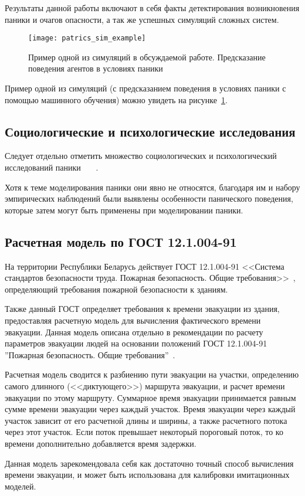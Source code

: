 Результаты данной работы включают в себя факты детектирования возникновения паники и очагов опасности, а так же успешных симуляций сложных систем.

\begin{figure}[ht!]
  \texttt{[image: patrics\_sim\_example]}
  \caption{Пример одной из симуляций в обсуждаемой работе. Предсказание поведения агентов в условиях паники}
  \label{sub:overview:patrics:sim_example}
\end{figure}

Пример одной из симуляций (с предсказанием поведения в условиях паники с помощью машинного обучения) можно увидеть на рисунке~\ref{sub:overview:patrics:sim_example}.


\subsection{Социологические и психологические исследования}
\label{sub:overview:soc}

Следует отдельно отметить множество социологических и психологический исследований паники \cite{mawson2005understanding}~\cite{quarantelli1975panic}~\cite{quarantelli2001sociology}~\cite{quarantelli1979panic}.

Хотя к теме моделирования паники они явно не относятся, благодаря им и набору эмпирических наблюдений были выявлены особенности панического поведения,
которые затем могут быть применены при моделировании паники.


\subsection{Расчетная модель по ГОСТ 12.1.004-91}
\label{sub:overview:gost}

На территории Республики Беларусь действует ГОСТ 12.1.004-91 <<Система стандартов безопасности труда. Пожарная безопасность. Общие требования>>~\cite{gost_fire_safety},
определяющий требования пожарной безопасности к зданиям.

Также данный ГОСТ определяет требования к времени эвакуации из здания, предоставляя расчетную модель для вычисления фактического времени эвакуации.
Данная модель описана отдельно в рекомендации по расчету параметров эвакуации людей на основании положений ГОСТ 12.1.004-91 ''Пожарная безопасность. Общие требования''~\cite{model_gost}.

Расчетная модель сводится к разбиению пути эвакуации на участки, определению самого длинного (<<диктующего>>) маршрута эвакуации, и расчет времени эвакуации по этому маршруту.
Суммарное время эвакуации принимается равным сумме времени эвакуации через каждый участок.
Время эвакуации через каждый участок зависит от его расчетной длины и ширины, а также расчетного потока через этот участок.
Если поток превышает некоторый пороговый поток, то ко времени дополнительно добавляется время задержки.

Данная модель зарекомендовала себя как достаточно точный способ вычисления времени эвакуации, и может быть использована для калибровки имитационных моделей.






